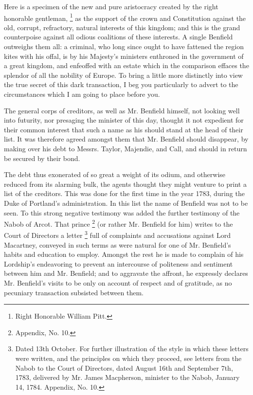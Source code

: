 Here is a specimen of the new and pure aristocracy created by the right honorable gentleman,
\footnote{ Right Honorable William Pitt.}
 as the support of the crown and Constitution against the old, corrupt, refractory, natural interests of this kingdom; and this is the grand counterpoise against all odious coalitions of these interests. A single Benfield outweighs them all: a criminal, who long since ought to have fattened the region kites with his offal, is by his Majesty's ministers enthroned in the government of a great kingdom, and enfeoffed with an estate which in the comparison effaces the splendor of all the nobility of Europe. To bring a little more distinctly into view the true secret of this dark transaction, I beg you particularly to advert to the circumstances which I am going to place before you.

The general corps of creditors, as well as Mr. Benfield himself, not looking well into futurity, nor presaging the minister of this day, thought it not expedient for their common interest that such a name as his should stand at the head of their list. It was therefore agreed amongst them that Mr. Benfield should disappear, by making over his debt to Messrs. Taylor, Majendie, and Call, and should in return be secured by their bond.

The debt thus exonerated of so great a weight of its odium, and otherwise reduced from its alarming bulk, the agents thought they might venture to print a list of the creditors. This was done for the first time in the year 1783, during the Duke of Portland's administration. In this list the name of Benfield was not to be seen. To this strong negative testimony was added the further testimony of the Nabob of Arcot. That prince
\footnote{ Appendix, No. 10.}
 (or rather Mr. Benfield for him) writes to the Court of Directors a letter
\footnote{ Dated 13th October. For further illustration of the style in which these letters were written, and the principles on which they proceed, see letters from the Nabob to the Court of Directors, dated August 16th and September 7th, 1783, delivered by Mr. James Macpherson, minister to the Nabob, January 14, 1784. Appendix, No. 10.}
 full of complaints and accusations against Lord Macartney, conveyed in such terms as were natural for one of Mr. Benfield's habits and education to employ. Amongst the rest he is made to complain of his Lordship's endeavoring to prevent an intercourse of politeness and sentiment between him and Mr. Benfield; and to aggravate the affront, he expressly declares Mr. Benfield's visits to be only on account of respect and of gratitude, as no pecuniary transaction subsisted between them.

